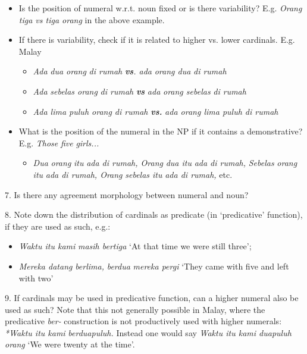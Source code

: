 \begin{itemize}
\item Is the position of numeral w.r.t. noun fixed or is there variability? E.g. \textit{Orang tiga vs tiga orang }in the above example.
\item If there is variability, check if it is related to higher vs. lower cardinals. E.g. Malay 

\begin{itemize}
\item \textit{Ada }\textit{dua orang}\textit{ di rumah }\textbf{\textit{vs}}\textit{. ada }\textit{orang dua}\textit{ di rumah}
\item \textit{Ada }\textit{sebelas orang}\textit{ di rumah }\textbf{\textit{vs}}\textit{ ada }\textit{orang sebelas}\textit{ di rumah}
\item \textit{Ada lima puluh orang di rumah }\textbf{\textit{vs.}}\textit{ ada orang lima puluh di rumah}
\end{itemize}
\item What is the position of the numeral in the NP if it contains a demonstrative? E.g. \textit{Those}\textit{ }\textit{five}\textit{ girls...  }

\begin{itemize}
\item \textit{Dua}\textit{ orang }\textit{itu}\textit{ ada di rumah, Orang }\textit{dua itu}\textit{ ada di rumah, }\textit{Sebelas}\textit{ orang }\textit{itu}\textit{ ada di rumah, Orang }\textit{sebelas itu}\textit{ ada di rumah, }etc.
\end{itemize}
\end{itemize}
7. Is there any agreement morphology between numeral and noun?

8. Note down the distribution of cardinals as predicate (in {\textquoteleft}predicative{\textquoteright} function), if they are used as such, e.g.:  

\begin{itemize}
\item \textit{Waktu itu kami }\textit{masih bertiga}\textit{ }{\textquoteleft}At that time we were still three{\textquoteright}; 
\item \textit{Mereka datang }\textit{berlima}\textit{, }\textit{berdua}\textit{ mereka pergi }{\textquoteleft}They came with five and left with two{\textquoteright}
\end{itemize}
9. If cardinals may be used in predicative function, can a higher numeral also be used as such? Note that this not generally possible in Malay, where the predicative \textit{ber-} construction is not productively used with higher numerals: \textit{*Waktu itu kami }\textit{berduapuluh}\textit{. }Instead one would say \textit{Waktu itu kami duapuluh orang }{\textquoteleft}We were twenty at the time{\textquoteright}. 

